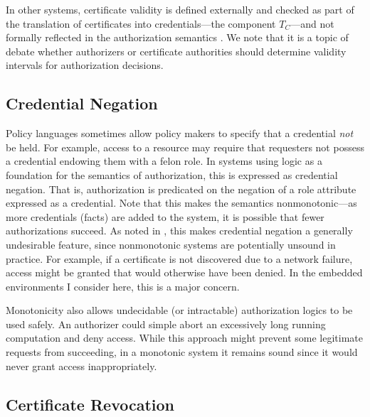 In other systems, certificate validity is defined externally and checked as part of the
translation of certificates into credentials---the component $T_C$---and not formally reflected
in the authorization semantics \cite{RFC-2693}. We note that it is a topic of debate whether
authorizers \cite{Rivest:CWECRL} or certificate authorities \cite{McDaniel:RTCWECRL} should
determine validity intervals for authorization decisions.

\subsection{Credential Negation}

Policy languages sometimes allow policy makers to specify that a credential \emph{not} be held.
For example, access to a resource may require that requesters not possess a credential endowing
them with a felon role. In systems using logic as a foundation for the semantics of
authorization, this is expressed as credential negation. That is, authorization is predicated on
the negation of a role attribute expressed as a credential. Note that this makes the semantics
nonmonotonic---as more credentials (facts) are added to the system, it is possible that fewer
authorizations succeed. As noted in \cite{seamons-policy02}, this makes credential negation a
generally undesirable feature, since nonmonotonic systems are potentially unsound in practice.
For example, if a certificate is not discovered due to a network failure, access might be
granted that would otherwise have been denied. In the embedded environments I consider here,
this is a major concern.

Monotonicity also allows undecidable (or intractable) authorization logics to be used safely. An
authorizer could simple abort an excessively long running computation and deny access. While
this approach might prevent some legitimate requests from succeeding, in a monotonic system it
remains sound since it would never grant access inappropriately.

\subsection{Certificate Revocation}

